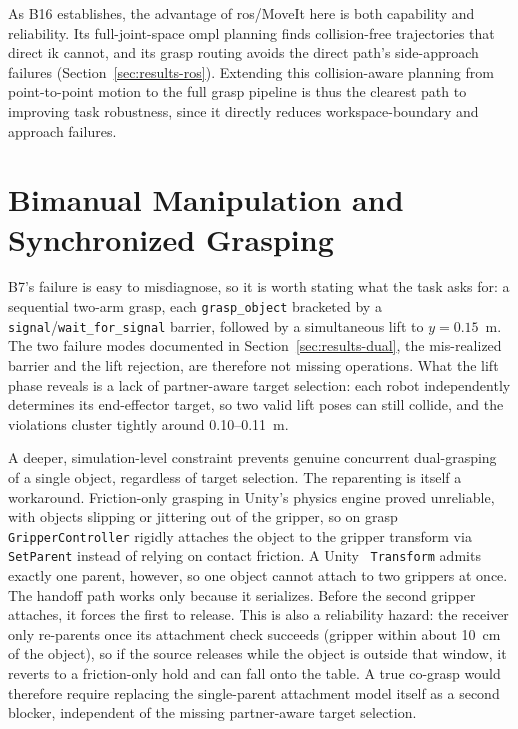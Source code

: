 As B16 establishes, the advantage of \gls{ros}/MoveIt here is both capability and reliability. Its full-joint-space \gls{ompl} planning finds collision-free trajectories that direct \gls{ik} cannot, and its grasp routing avoids the direct path's side-approach failures (Section~\ref{sec:results-ros}). Extending this collision-aware planning from point-to-point motion to the full grasp pipeline is thus the clearest path to improving task robustness, since it directly reduces workspace-boundary and approach failures.

\section{Bimanual Manipulation and Synchronized Grasping}\label{sec:bimanual}
B7’s failure is easy to misdiagnose, so it is worth stating what the task asks for: a sequential two-arm grasp, each \texttt{grasp\_object} bracketed by a \texttt{signal}/\texttt{wait\_for\_signal} barrier, followed by a simultaneous lift to $y=0.15$~m. The two failure modes documented in Section~\ref{sec:results-dual}, the mis-realized barrier and the lift rejection, are therefore not missing operations. What the lift phase reveals is a lack of partner-aware target selection: each robot independently determines its end-effector target, so two valid lift poses can still collide, and the violations cluster tightly around 0.10–0.11~m.

A deeper, simulation-level constraint prevents genuine concurrent dual-grasping of a single object, regardless of target selection. The reparenting is itself a workaround. Friction-only grasping in Unity’s physics engine proved unreliable, with objects slipping or jittering out of the gripper, so on grasp \texttt{GripperController} rigidly attaches the object to the gripper transform via \texttt{SetParent} instead of relying on contact friction. A Unity~\cite{unity} \texttt{Transform} admits exactly one parent, however, so one object cannot attach to two grippers at once. The handoff path works only because it serializes. Before the second gripper attaches, it forces the first to release. This is also a reliability hazard: the receiver only re-parents once its attachment check succeeds (gripper within about 10~cm of the object), so if the source releases while the object is outside that window, it reverts to a friction-only hold and can fall onto the table. A true co-grasp would therefore require replacing the single-parent attachment model itself as a second blocker, independent of the missing partner-aware target selection.

